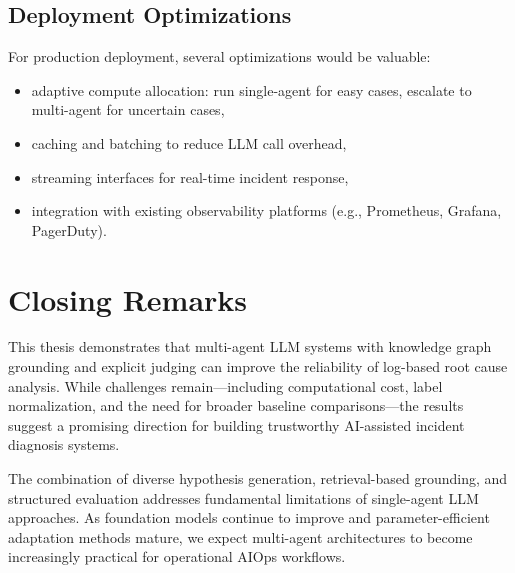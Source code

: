 \subsection{Deployment Optimizations}
For production deployment, several optimizations would be valuable:
\begin{itemize}
  \item adaptive compute allocation: run single-agent for easy cases, escalate to multi-agent for
        uncertain cases,
  \item caching and batching to reduce LLM call overhead,
  \item streaming interfaces for real-time incident response,
  \item integration with existing observability platforms (e.g., Prometheus, Grafana,
        PagerDuty).
\end{itemize}

\section{Closing Remarks}
This thesis demonstrates that multi-agent LLM systems with knowledge graph grounding and explicit
judging can improve the reliability of log-based root cause analysis. While challenges
remain---including computational cost, label normalization, and the need for broader baseline
comparisons---the results suggest a promising direction for building trustworthy AI-assisted
incident diagnosis systems.

The combination of diverse hypothesis generation, retrieval-based grounding, and structured
evaluation addresses fundamental limitations of single-agent LLM approaches. As foundation models
continue to improve and parameter-efficient adaptation methods mature, we expect multi-agent
architectures to become increasingly practical for operational AIOps workflows.
